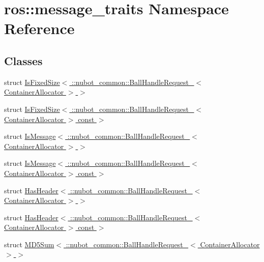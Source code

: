 \hypertarget{namespaceros_1_1message__traits}{\section{ros\-:\-:message\-\_\-traits Namespace Reference}
\label{namespaceros_1_1message__traits}
}
\subsection*{Classes}
\begin{DoxyCompactItemize}
\item 
struct \hyperlink{structros_1_1message__traits_1_1IsFixedSize_3_01_1_1nubot__common_1_1BallHandleRequest___3_01ContainerAllocator_01_4_01_4}{Is\-Fixed\-Size$<$ \-::nubot\-\_\-common\-::\-Ball\-Handle\-Request\-\_\-$<$ Container\-Allocator $>$ $>$}
\item 
struct \hyperlink{structros_1_1message__traits_1_1IsFixedSize_3_01_1_1nubot__common_1_1BallHandleRequest___3_01Coneadde5ba881923a1f46e40ece081a5cf}{Is\-Fixed\-Size$<$ \-::nubot\-\_\-common\-::\-Ball\-Handle\-Request\-\_\-$<$ Container\-Allocator $>$ const  $>$}
\item 
struct \hyperlink{structros_1_1message__traits_1_1IsMessage_3_01_1_1nubot__common_1_1BallHandleRequest___3_01ContainerAllocator_01_4_01_4}{Is\-Message$<$ \-::nubot\-\_\-common\-::\-Ball\-Handle\-Request\-\_\-$<$ Container\-Allocator $>$ $>$}
\item 
struct \hyperlink{structros_1_1message__traits_1_1IsMessage_3_01_1_1nubot__common_1_1BallHandleRequest___3_01Contaad99cb5811a55b3ed8063a5cb054420a}{Is\-Message$<$ \-::nubot\-\_\-common\-::\-Ball\-Handle\-Request\-\_\-$<$ Container\-Allocator $>$ const  $>$}
\item 
struct \hyperlink{structros_1_1message__traits_1_1HasHeader_3_01_1_1nubot__common_1_1BallHandleRequest___3_01ContainerAllocator_01_4_01_4}{Has\-Header$<$ \-::nubot\-\_\-common\-::\-Ball\-Handle\-Request\-\_\-$<$ Container\-Allocator $>$ $>$}
\item 
struct \hyperlink{structros_1_1message__traits_1_1HasHeader_3_01_1_1nubot__common_1_1BallHandleRequest___3_01Conta6a99718f759f96d9689d2c2cdc44697c}{Has\-Header$<$ \-::nubot\-\_\-common\-::\-Ball\-Handle\-Request\-\_\-$<$ Container\-Allocator $>$ const  $>$}
\item 
struct \hyperlink{structros_1_1message__traits_1_1MD5Sum_3_01_1_1nubot__common_1_1BallHandleRequest___3_01ContainerAllocator_01_4_01_4}{M\-D5\-Sum$<$ \-::nubot\-\_\-common\-::\-Ball\-Handle\-Request\-\_\-$<$ Container\-Allocator $>$ $>$}

\end{DoxyCompactItemize}
